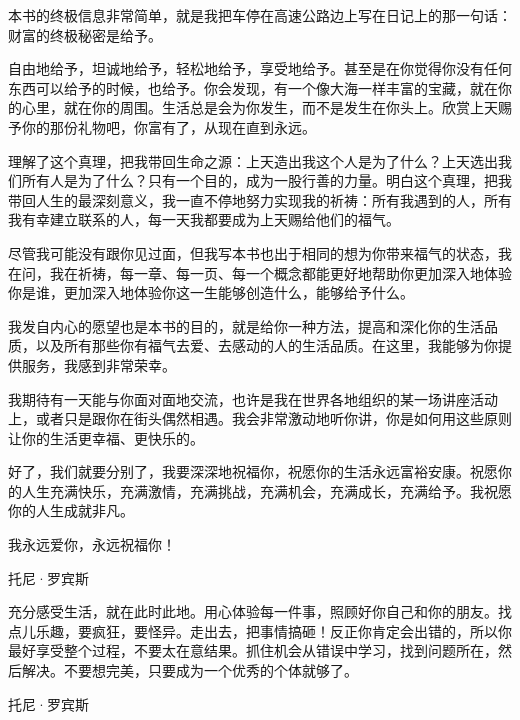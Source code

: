 本书的终极信息非常简单，就是我把车停在高速公路边上写在日记上的那一句话：财富的终极秘密是给予。

自由地给予，坦诚地给予，轻松地给予，享受地给予。甚至是在你觉得你没有任何东西可以给予的时候，也给予。你会发现，有一个像大海一样丰富的宝藏，就在你的心里，就在你的周围。生活总是会为你发生，而不是发生在你头上。欣赏上天赐予你的那份礼物吧，你富有了，从现在直到永远。

理解了这个真理，把我带回生命之源：上天造出我这个人是为了什么？上天选出我们所有人是为了什么？只有一个目的，成为一股行善的力量。明白这个真理，把我带回人生的最深刻意义，我一直不停地努力实现我的祈祷：所有我遇到的人，所有我有幸建立联系的人，每一天我都要成为上天赐给他们的福气。

尽管我可能没有跟你见过面，但我写本书也出于相同的想为你带来福气的状态，我在问，我在祈祷，每一章、每一页、每一个概念都能更好地帮助你更加深入地体验你是谁，更加深入地体验你这一生能够创造什么，能够给予什么。

我发自内心的愿望也是本书的目的，就是给你一种方法，提高和深化你的生活品质，以及所有那些你有福气去爱、去感动的人的生活品质。在这里，我能够为你提供服务，我感到非常荣幸。

我期待有一天能与你面对面地交流，也许是我在世界各地组织的某一场讲座活动上，或者只是跟你在街头偶然相遇。我会非常激动地听你讲，你是如何用这些原则让你的生活更幸福、更快乐的。

好了，我们就要分别了，我要深深地祝福你，祝愿你的生活永远富裕安康。祝愿你的人生充满快乐，充满激情，充满挑战，充满机会，充满成长，充满给予。我祝愿你的人生成就非凡。

我永远爱你，永远祝福你！

托尼·罗宾斯

充分感受生活，就在此时此地。用心体验每一件事，照顾好你自己和你的朋友。找点儿乐趣，要疯狂，要怪异。走出去，把事情搞砸！反正你肯定会出错的，所以你最好享受整个过程，不要太在意结果。抓住机会从错误中学习，找到问题所在，然后解决。不要想完美，只要成为一个优秀的个体就够了。

托尼·罗宾斯
